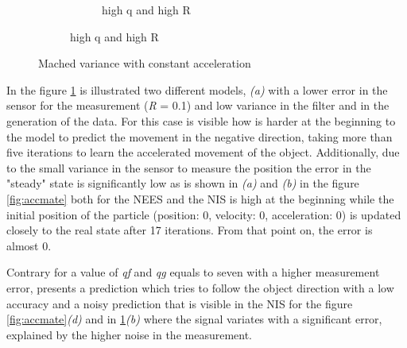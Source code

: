 \documentclass{article}
\begin{document}
\begin{figure}[H]
\begin{subfigure}{1\textwidth}
\begin{subfigure}{.5\textwidth}
                    \caption{high q and high R }
                \end{subfigure}                       
            \end{subfigure}
            \caption{Mached variance with constant acceleration}        
            \label{fig:accmat}
        \end{figure}

        In the figure \ref{fig:accmat} is illustrated two different models, \textit{(a)} with a lower error in the 
        sensor for the measurement (\textit{R} = 0.1) and low variance in the filter and in the generation of the data.
        For this case is visible how is harder at the beginning to the model to predict the movement in the negative
        direction, taking more than five iterations to learn the accelerated movement of the object. Additionally, due to
        the small variance in the sensor to measure the position the error in the "steady" state is significantly low as is
        shown in \textit{(a)} and \textit{(b)} in the figure \ref{fig:accmate} both for the NEES and the NIS is high at
        the beginning while the initial position of the particle (position: 0, velocity: 0, acceleration: 0) is updated closely
        to the real state after 17 iterations. From that point on, the error is almost 0.

        Contrary for a value of \textit{qf} and \textit{qg} equals to seven with a higher measurement error, presents a prediction
        which tries to follow the object direction with a low accuracy and a noisy prediction that is visible in the NIS for the figure \ref{fig:accmate}\textit{(d)}
        and in \ref{fig:accmat}\textit{(b)} where the signal variates with a significant error, explained by the higher noise in the
        measurement.
\end{document}
